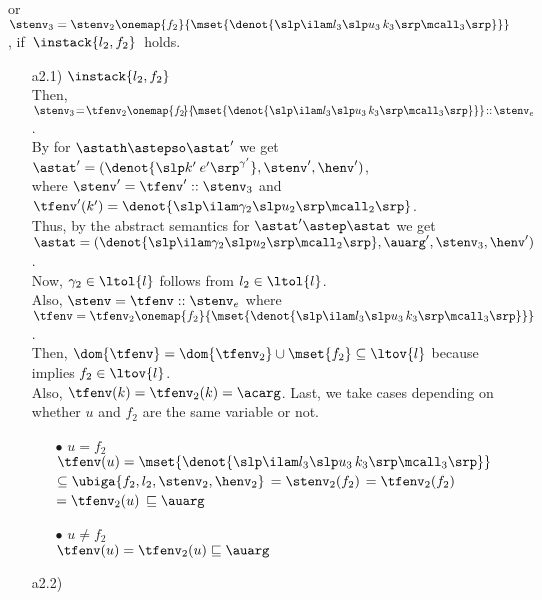 \documentclass{LMCS}
\theoremstyle{definition} \newtheorem{property}[thm]{Property}
\begin{document}
\begin{enumerate}[$\bullet$]
\begin{enumerate}[$\bullet$]
            or $\stenv_3 = \stenv_2\onemap{f_2}{\mset{\denot{\lamthree}}}$,
            if $\:\instack{l_2, f_2}\:$ holds.
            \begin{enumerate}[$\bullet$]
            \item[a2.1)]
              $\instack{l_2, f_2}$ \\
              Then,
              \mbox{$\stenv_3 \!=\! 
                \tfenv_2\onemap{f_2\!}{\!\mset{\denot{\lamthree}}} \!::\! \stenv_e$.} \\
              By \ih{} for $\astath \astepso \astat'$ we get 
              $\astat' = (\denot{\slp k' \: e'\srp^{\gamma'}}, 
              \stenv', \henv')$, \\
              where $\stenv' = \tfenv'::\stenv_3$ 
              and $\tfenv'(k') = \denot{\lamtwo}$. \\
              Thus, by the abstract semantics for $\astat' \astep \astat$
              we get \\
              $\astat = (\denot{\lamtwo}, \auarg', \stenv_3, \henv')$. \\
              Now, $\gamma_2 \in \ltol{l}$ follows from $l_2 \in \ltol{l}$. \\
              Also, $\stenv = \tfenv::\stenv_e$ 
              where $\tfenv = \tfenv_2\onemap{f_2}{\mset{\denot{\lamthree}}}$. \\
              Then, $\dom{\tfenv} = \dom{\tfenv_2} \cup \mset{f_2}
              \subseteq \ltov{l}$
              because  implies $f_2 \in \ltov{l}$. \\
              Also, $\tfenv(k) = \tfenv_2(k) = \acarg$. 
              Last, we take cases depending on whether $u$ and $f_2$ are the
              same variable or not.
              \begin{enumerate}[$\bullet$]
              \item[$\bullet$]
                $u = f_2$ \\
                $\tfenv(u) = \mset{\denot{\lamthree}}$ 
                $\subseteq \ubiga{f_2, l_2, \stenv_2, \henv_2}$ 
                $= \stenv_2(f_2)$ 
                $= \tfenv_2(f_2)$
                $= \tfenv_2(u)$
                $ \sqsubseteq \auarg$
              \item[$\bullet$]
                $u \neq f_2$ \\
                $\tfenv(u) = \tfenv_2(u) \sqsubseteq \auarg$
              \end{enumerate}
            \item[a2.2)]

\end{enumerate}
\end{enumerate}
\end{enumerate}
\end{document}
